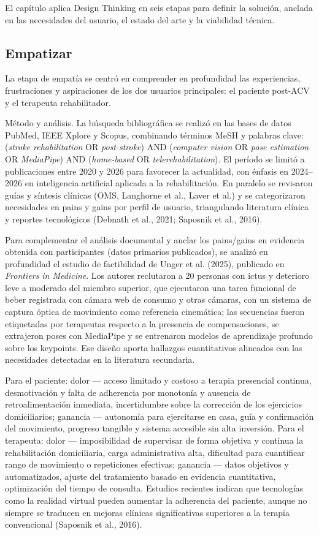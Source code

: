 \documentclass[11pt,a4paper]{article}
\begin{document}
El capítulo aplica Design Thinking en seis etapas para definir la solución, anclada en las necesidades del usuario, el estado del arte y la viabilidad técnica.

\subsection{Empatizar}
La etapa de empatía se centró en comprender en profundidad las experiencias, frustraciones y aspiraciones de los dos usuarios principales: el paciente post-ACV y el terapeuta rehabilitador.

Método y análisis. La búsqueda bibliográfica se realizó en las bases de datos PubMed, IEEE Xplore y Scopus, combinando términos MeSH y palabras clave: (\textit{stroke rehabilitation} OR \textit{post-stroke}) AND (\textit{computer vision} OR \textit{pose estimation} OR \textit{MediaPipe}) AND (\textit{home-based} OR \textit{telerehabilitation}). El período se limitó a publicaciones entre 2020 y 2026 para favorecer la actualidad, con énfasis en 2024--2026 en inteligencia artificial aplicada a la rehabilitación. En paralelo se revisaron guías y síntesis clínicas (OMS, Langhorne et al., Laver et al.) y se categorizaron necesidades en pains y gains por perfil de usuario, triangulando literatura clínica y reportes tecnológicos (Debnath et al., 2021; Saposnik et al., 2016).

Para complementar el análisis documental y anclar los pains/gains en evidencia obtenida con participantes (datos primarios publicados), se analizó en profundidad el estudio de factibilidad de Unger et al. (2025), publicado en \textit{Frontiers in Medicine}. Los autores reclutaron a 20 personas con ictus y deterioro leve a moderado del miembro superior, que ejecutaron una tarea funcional de beber registrada con cámara web de consumo y otras cámaras, con un sistema de captura óptica de movimiento como referencia cinemática; las secuencias fueron etiquetadas por terapeutas respecto a la presencia de compensaciones, se extrajeron poses con MediaPipe y se entrenaron modelos de aprendizaje profundo sobre los keypoints. Ese diseño aporta hallazgos cuantitativos alineados con las necesidades detectadas en la literatura secundaria.

Para el paciente: dolor --- acceso limitado y costoso a terapia presencial continua, desmotivación y falta de adherencia por monotonía y ausencia de retroalimentación inmediata, incertidumbre sobre la corrección de los ejercicios domiciliarios; ganancia --- autonomía para ejercitarse en casa, guía y confirmación del movimiento, progreso tangible y sistema accesible sin alta inversión. Para el terapeuta: dolor --- imposibilidad de supervisar de forma objetiva y continua la rehabilitación domiciliaria, carga administrativa alta, dificultad para cuantificar rango de movimiento o repeticiones efectivas; ganancia --- datos objetivos y automatizados, ajuste del tratamiento basado en evidencia cuantitativa, optimización del tiempo de consulta. Estudios recientes indican que tecnologías como la realidad virtual pueden aumentar la adherencia del paciente, aunque no siempre se traducen en mejoras clínicas significativas superiores a la terapia convencional (Saposnik et al., 2016).
\end{document}
